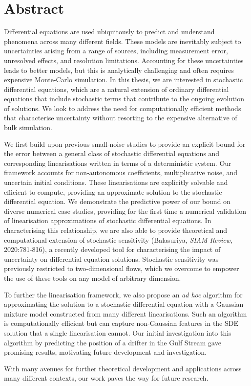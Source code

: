 \chapter{Abstract}
\label{ch:abstract}

Differential equations are used ubiquitously to predict and understand phenomena across many different fields.
These models are inevitably subject to uncertainties arising from a range of sources, including measurement error, unresolved effects, and resolution limitations.
Accounting for these uncertainties leads to better models, but this is analytically challenging and often requires expensive Monte-Carlo simulation.
In this thesis, we are interested in stochastic differential equations, which are a natural extension of ordinary differential equations that include stochastic terms that contribute to the ongoing evolution of solutions.
We look to address the need for computationally efficient methods that characterise uncertainty without resorting to the expensive alternative of bulk simulation.

We first build upon previous small-noise studies to provide an explicit bound for the error between a general class of stochastic differential equations and corresponding linearisations written in terms of a deterministic system.
Our framework accounts for non-autonomous coefficients, multiplicative noise, and uncertain initial conditions.
These linearisations are explicitly solvable and efficient to compute, providing an approximate solution to the stochastic differential equation.
We demonstrate the predictive power of our bound on diverse numerical case studies, providing for the first time a numerical validation of linearisation approximations of stochastic differential equations.
In characterising this relationship, we are also able to provide theoretical and computational extension of stochastic sensitivity (Balasuriya, \emph{SIAM Review}, 2020:781-816), a recently developed tool for characterising the impact of uncertainty on differential equation solutions.
Stochastic sensitivity was previously restricted to two-dimensional flows, which we overcome to empower the use of these tools on any model of arbitrary dimension.

To further the linearisation framework, we also propose an \emph{ad hoc} algorithm for approximating the solution to a stochastic differential equation with a Gaussian mixture model constructed from many different linearisations.
Such an algorithm is computationally efficient but can capture non-Gaussian features in the SDE solution that a single linearisation cannot.
Our initial investigation into this algorithm by predicting the position of a drifter in the Gulf Stream gave promising results, motivating future development and investigation.

With many avenues for further theoretical development and applications across many different contexts, our work paves the way for future research.
